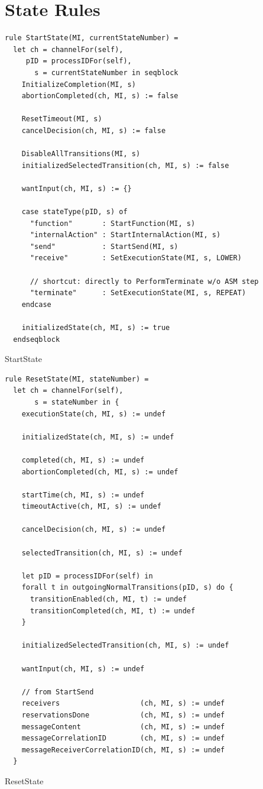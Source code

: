 \section{State Rules}

\begin{listing}[H]
\begin{verbatim}
rule StartState(MI, currentStateNumber) =
  let ch = channelFor(self),
     pID = processIDFor(self),
       s = currentStateNumber in seqblock
    InitializeCompletion(MI, s)
    abortionCompleted(ch, MI, s) := false

    ResetTimeout(MI, s)
    cancelDecision(ch, MI, s) := false

    DisableAllTransitions(MI, s)
    initializedSelectedTransition(ch, MI, s) := false

    wantInput(ch, MI, s) := {}

    case stateType(pID, s) of
      "function"       : StartFunction(MI, s)
      "internalAction" : StartInternalAction(MI, s)
      "send"           : StartSend(MI, s)
      "receive"        : SetExecutionState(MI, s, LOWER)

      // shortcut: directly to PerformTerminate w/o ASM step
      "terminate"      : SetExecutionState(MI, s, REPEAT)
    endcase

    initializedState(ch, MI, s) := true
  endseqblock
\end{verbatim}
\caption{StartState}
\label{lst:asm:StartState}
\end{listing}




\begin{listing}[H]
\begin{verbatim}
rule ResetState(MI, stateNumber) =
  let ch = channelFor(self),
       s = stateNumber in {
    executionState(ch, MI, s) := undef

    initializedState(ch, MI, s) := undef

    completed(ch, MI, s) := undef
    abortionCompleted(ch, MI, s) := undef

    startTime(ch, MI, s) := undef
    timeoutActive(ch, MI, s) := undef

    cancelDecision(ch, MI, s) := undef

    selectedTransition(ch, MI, s) := undef

    let pID = processIDFor(self) in
    forall t in outgoingNormalTransitions(pID, s) do {
      transitionEnabled(ch, MI, t) := undef
      transitionCompleted(ch, MI, t) := undef
    }

    initializedSelectedTransition(ch, MI, s) := undef

    wantInput(ch, MI, s) := undef

    // from StartSend
    receivers                   (ch, MI, s) := undef
    reservationsDone            (ch, MI, s) := undef
    messageContent              (ch, MI, s) := undef
    messageCorrelationID        (ch, MI, s) := undef
    messageReceiverCorrelationID(ch, MI, s) := undef
  }
\end{verbatim}
\caption{ResetState}
\label{lst:asm:ResetState}
\end{listing}




